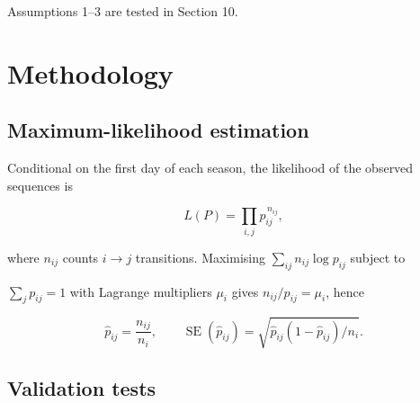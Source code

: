 \documentclass[11pt,a4paper]{article}
\begin{document}
Assumptions 1--3 are tested in Section 10.



\section{Methodology}\label{methodology}



\subsection{Maximum-likelihood estimation}\label{maximum-likelihood-estimation}



Conditional on the first day of each season, the likelihood of the observed sequences is

\[L(P)=\prod_{i,j} p_{ij}^{\,n_{ij}},\]

where \(n_{ij}\) counts \(i\to j\) transitions. Maximising \(\sum_{ij} n_{ij}\log p_{ij}\) subject to

\(\sum_j p_{ij}=1\) with Lagrange multipliers \(\mu_i\) gives \(n_{ij}/p_{ij}=\mu_i\), hence

\[\hat p_{ij}=\frac{n_{ij}}{n_i},\qquad \operatorname{SE}(\hat p_{ij})=\sqrt{\hat p_{ij}(1-\hat p_{ij})/n_i}.\]



\subsection{Validation tests}\label{validation-tests}
\end{document}
